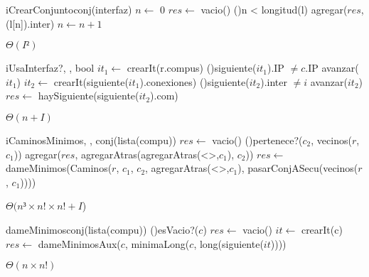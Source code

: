 \begin{Algoritmos}
   \begin{algoritmo}{iCrearConjunto}{}{conj(interfaz)}{}
     $n \gets$ 0
    $res \gets$ vacio()
   \While(){n < longitud(l)}{
      agregar($res$, (l[n]).inter)
      $n \gets n+1$
    }
  \end{algoritmo} 
  {} %
  {} %
  {$\Theta(I²)$} %
  {} %

  \begin{algoritmo}{iUsaInterfaz?}{, , }{bool}{}
     $it_{1} \gets$ crearIt(r.compus)
    \While(){siguiente($it_{1}$).IP $\neq c$.IP}{
      avanzar($it_{1}$) 
    }
     $it_{2} \gets$ crearIt(siguiente($it_{1}$).conexiones)
    \While(){siguiente($it_{2}$).inter $\neq i$}{
     avanzar($it_{2}$)
    }
    $res \gets$ haySiguiente(siguiente($it_{2}$).com)
  \end{algoritmo} \datosAlgoritmo{} %
  {} %
  {} %
  {$\Theta(n+I)$} %
  {} %
   
  \begin{algoritmo}{iCaminosMinimos}{, , }{conj(lista(compu))}{}
    $res \gets$ vacio()
    \eIf(){pertenece?($c_{2}$, vecinos($r$, $c_{1}$))}{
      agregar($res$, agregarAtras(agregarAtras(<>,$c_{1}$), $c_{2}$))
    }{
      $res \gets$ dameMinimos(Caminos($r$, $c_{1}$, $c_{2}$, agregarAtras(<>,$c_{1}$), pasarConjASecu(vecinos($r$, $c_{1}$))))
    }
  \end{algoritmo}
  \datosAlgoritmo{} %
  {} %
  {} %
  {$\Theta(n³ \times n! \times n! + I$)} %
  {} %

  \begin{algoritmo}{dameMinimos}{}{conj(lista(compu))}
    \eIf(){esVacio?($c$)}{
      $res \gets$ vacio()
    }{
       $it \gets$ crearIt(c)
      $res \gets$ dameMinimosAux($c$, minimaLong($c$, long(siguiente($it$))))
    }
  \end{algoritmo}
  {} %
  {} %
  {$\Theta(n \times n!)$} %
  {} %


\end{Algoritmos}
